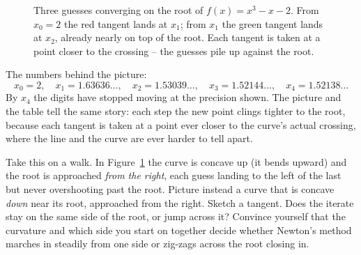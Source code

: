 \begin{figure}[H]
\centering
{}
\caption{Three guesses converging on the root of $f(x)=x^3-x-2$. From $x_0=2$ the
red tangent lands at $x_1$; from $x_1$ the green tangent lands at $x_2$, already
nearly on top of the root. Each tangent is taken at a point closer to the
crossing -- the guesses pile up against the root.}
\label{ch19:fig-cubic}
\end{figure}

The numbers behind the picture:
\[
  x_0 = 2, \quad x_1 = 1.63636\ldots, \quad x_2 = 1.53039\ldots,
  \quad x_3 = 1.52144\ldots, \quad x_4 = 1.52138\ldots
\]
By $x_4$ the digits have stopped moving at the precision shown. The picture and the
table tell the same story: each step the new point clings tighter to the root,
because each tangent is taken at a point ever closer to the curve's actual
crossing, where the line and the curve are ever harder to tell apart.

\begin{walkbox}
Take this on a walk. In Figure~\ref{ch19:fig-cubic} the curve is concave up (it
bends upward) and the root is approached \emph{from the right}, each guess landing
to the left of the last but never overshooting past the root. Picture instead a
curve that is concave \emph{down} near its root, approached from the right. Sketch
a tangent. Does the iterate stay on the same side of the root, or jump across it?
Convince yourself that the curvature and which side you start on together decide
whether Newton's method marches in steadily from one side or zig-zags across the
root closing in.
\end{walkbox}

